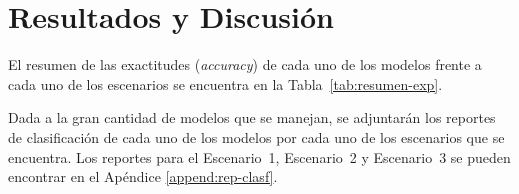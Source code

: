 \section{Resultados y Discusión}
El resumen de las exactitudes (\textit{accuracy}) de cada uno de los modelos frente a cada uno de los escenarios se encuentra en la Tabla~\ref{tab:resumen-exp}.



Dada a la gran cantidad de modelos que se manejan, se adjuntarán los reportes de clasificación de cada uno de los modelos por cada uno de los escenarios que se encuentra. Los reportes para el Escenario~1, Escenario~2 y Escenario~3 se pueden encontrar en el Apéndice \ref{append:rep-clasf}.






